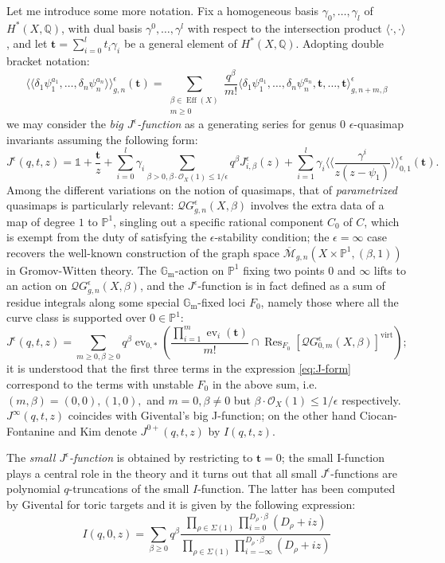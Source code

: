 \documentclass[11pt]{amsart}
\newcommand{\M}[4]{\overline{\mathcal{M}}_{#1,#2}(#3,#4)}
\newcommand{\QGe}[4]{\mathcal{Q}G^{\epsilon}_{#1,#2}(#3,#4)}
\newcommand{\PP}{\mathbb P}
\newcommand{\QQ}{\mathbb{Q}}
\newcommand{\OO}{\mathcal{O}}
\newcommand{\Gm}{\mathbb{G}_{\text{m}}}
\newcommand{\virt}[1]{[#1]^{\operatorname{virt}}}
\newcommand{\lala}{\langle\!\langle}
\newcommand{\rara}{\rangle\!\rangle}
\newcommand{\ev}{\operatorname{ev}}
\theoremstyle{definition}
\theoremstyle{definition}
\newcommand{\ilemph}[1]{\emph{#1}}
\begin{document}
Let me introduce some more notation. Fix a homogeneous basis $\gamma_0,\ldots,\gamma_l$ of $H^*(X,\QQ)$, with dual basis $\gamma^0,\ldots,\gamma^l$ with respect to the intersection product $\langle\cdot,\cdot\rangle$, and let $\mathbf{t}=\sum_{i=0}^lt_i\gamma_i$ be a general element of $H^*(X,\QQ)$. Adopting double bracket notation:
\[\lala\delta_1\psi_1^{a_1},\ldots,\delta_n\psi_n^{a_n}\rara^\epsilon_{g,n}(\mathbf{t})=\sum_{\substack{\beta\in\operatorname{Eff}(X) \\ m\geq 0}}\frac{q^\beta}{m!}\langle \delta_1\psi_1^{a_1},\ldots,\delta_n\psi_n^{a_n},\mathbf t,\ldots,\mathbf t\rangle^{\epsilon}_{g,n+m,\beta} \]
we may consider the \ilemph{big $J^\epsilon$-function} as a generating series for genus $0$ $\epsilon$-quasimap invariants assuming the following form:
\begin{equation}\label{eq:J-form} J^\epsilon(q,t,z)=\mathds{1}+\frac{\mathbf{t}}{z}+\sum_{i=0}^l\gamma_i\sum_{\beta> 0,\beta\cdot\OO_X(1)\leq 1/\epsilon}q^\beta J^\epsilon_{i,\beta}(z)+\sum_{i=1}^l\gamma_i\lala\frac{\gamma^i}{z(z-\psi_1)}\rara^\epsilon_{0,1}(\mathbf{t}).\end{equation}
Among the different variations on the notion of quasimaps, that of \ilemph{parametrized} quasimaps is particularly relevant:
$\QGe{g}{n}{X}{\beta}$ involves the extra data of a map of degree $1$ to $\PP^1$, singling out a specific rational component $C_0$ of $C$, which is exempt from the duty of satisfying the $\epsilon$-stability condition; the $\epsilon=\infty$ case recovers the well-known construction of the graph space $\M{g}{n}{X\times\PP^1}{(\beta,1)}$ in Gromov-Witten theory. The $\Gm$-action on $\PP^1$ fixing two points $0$ and $\infty$ lifts to an action on $\QGe{g}{n}{X}{\beta}$, and the $J^\epsilon$-function is in fact defined as a sum of residue integrals along some special $\Gm$-fixed loci $F_0$, namely those where all the curve class is supported over $0\in\PP^1$:
\[J^\epsilon(q,t,z)=\sum_{m\geq0,\beta\geq0}q^\beta \ev_{0,*}\left(\frac{\prod_{i=1}^m \ev_i(\mathbf{t})}{m!}\cap\operatorname{Res}_{F_0}\virt{\QGe{0}{m}{X}{\beta}}\right);\]
it is understood that the first three terms in the expression \eqref{eq:J-form} correspond to the terms with unstable $F_0$ in the above sum, i.e. $(m,\beta)=(0,0), (1,0),$ and $m=0,\beta\neq 0$ but $\beta\cdot\OO_X(1)\leq 1/\epsilon$ respectively. $J^\infty(q,t,z)$ coincides with Givental's big J-function; on the other hand Ciocan-Fontanine and Kim denote $J^{0+}(q,t,z)$ by $I(q,t,z)$.

The \ilemph{small $J^\epsilon$-function} is obtained by restricting to $\mathbf t=0$; the small I-function plays a central role in the theory and it turns out that all small $J^\epsilon$-functions are polynomial $q$-truncations of the small $I$-function.
The latter has been computed by Givental for toric targets and it is given by the following expression:
\begin{equation}\label{eq:GiventalI} I(q,0,z)=\sum_{\beta\geq 0}q^\beta \frac{\prod_{\rho\in\Sigma(1)}\prod_{i=0}^{D_\rho\cdot\beta}(D_\rho+iz)}{\prod_{\rho\in\Sigma(1)}\prod_{i=-\infty}^{D_\rho\cdot\beta}(D_\rho+iz)}\end{equation}
\end{document}

